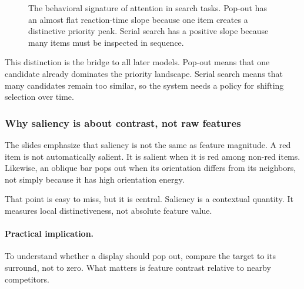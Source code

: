 \begin{figure}[!htbp]
\centering
{}
\caption{The behavioral signature of attention in search tasks. Pop-out has an almost flat reaction-time slope because one item creates a distinctive priority peak. Serial search has a positive slope because many items must be inspected in sequence.}
\end{figure}

This distinction is the bridge to all later models. Pop-out means that one candidate already dominates the priority landscape. Serial search means that many candidates remain too similar, so the system needs a policy for shifting selection over time.

\subsubsection{Why saliency is about contrast, not raw features}

The slides emphasize that saliency is not the same as feature magnitude. A red item is not automatically salient. It is salient when it is red among non-red items. Likewise, an oblique bar pops out when its orientation differs from its neighbors, not simply because it has high orientation energy.

That point is easy to miss, but it is central. Saliency is a contextual quantity. It measures local distinctiveness, not absolute feature value.

\paragraph{Practical implication.}
To understand whether a display should pop out, compare the target to its surround, not to zero. What matters is feature contrast relative to nearby competitors.

